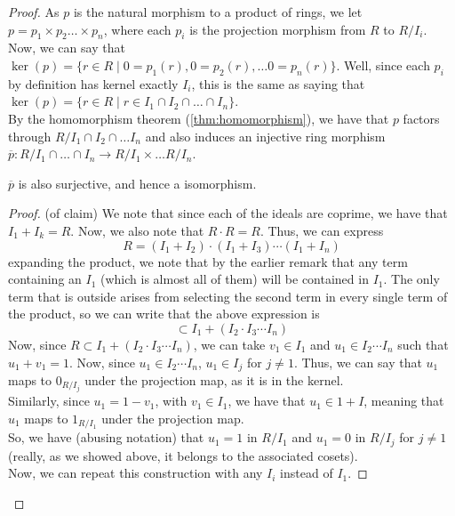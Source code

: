 \begin{proof}
    As $p$ is the natural morphism to a product of rings, we let $p = p_1 \times p_2 \dots \times p_n$,
    where each $p_i$ is the projection morphism from $R$ to $R / I_i$. Now, we can say that
    $\ker(p) = \{r \in R \mid 0 = p_1(r), 0 = p_2(r), \dots 0 = p_n(r) \}$. Well, since each $p_i$ by definition has
    kernel exactly $I_i$, this is the same as saying that
    $\ker(p) = \{r \in R \mid r \in I_1 \cap I_2 \cap \dots \cap I_n \}$. \\
    By the homomorphism theorem (\ref{thm:homomorphism}), we have that $p$ factors through
    $R / I_1 \cap I_2 \cap \dots I_n$ and also induces an injective ring morphism
    $\overline{p}: R/ I_1 \cap \dots \cap I_n \rightarrow R/I_1 \times \dots R/I_n$.
    \begin{claim}
        $\overline{p}$ is also surjective, and hence a isomorphism.
    \end{claim}
    \begin{proof} (of claim)
        We note that since each of the ideals are coprime, we have that $I_1 + I_k = R$.
        Now, we also note that $R \cdot R = R$. Thus, we can express
        $$
        R = (I_1  + I_2) \cdot (I_1 + I_3) \cdots (I_1 + I_n)
        $$
        expanding the product, we note that by the earlier remark that any term
        containing an $I_1$ (which is almost all of them) will be contained in
        $I_1$. The only term that is outside arises from selecting the second term
        in every single term of the product, so we can write that the above expression
        is
        $$
        \subset I_1 + (I_2 \cdot I_3 \cdots I_n)
        $$
        Now, since $R \subset I_1 + (I_2 \cdot I_3 \cdots I_n)$, we can take
        $v_1 \in I_1$ and $u_1 \in I_2 \cdots I_n$ such that $u_1 + v_1 = 1$.
        Now, since $u_1 \in I_2 \cdots I_n$, $u_1 \in I_j$ for $j \neq 1$. Thus,
        we can say that $u_1$ maps to $0_{R/I_j}$ under the projection map, as it is
        in the kernel. \\
        Similarly, since $u_1 = 1 - v_1$, with $v_1 \in I_1$, we have that $u_1 \in 1 + I$,
        meaning that $u_1$ maps to $1_{R/I_1}$ under the projection map. \\
        So, we have (abusing notation) that $u_1 = 1$ in $R/I_1$ and $u_1 = 0$ in $R/I_j$ for $j \neq 1$
        (really, as we showed above, it belongs to the associated cosets). \\
        Now, we can repeat this construction with any $I_i$ instead of $I_1$.

\end{proof}
\end{proof}

